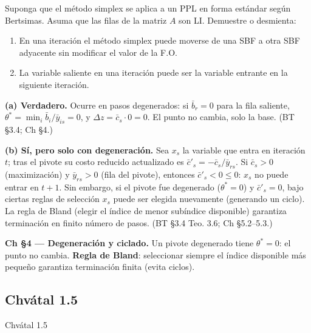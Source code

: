 \documentclass[12pt]{article}
\theoremstyle{plain}
\begin{document}
Suponga que el método simplex se aplica a un PPL en forma estándar según Bertsimas. Asuma
que las filas de la matriz $A$ son LI. Demuestre o desmienta:

\begin{enumerate}[label=\alph*)]
      \item En una iteración el método simplex puede moverse de una SBF a otra SBF
            adyacente sin modificar el valor de la F.O.

      \item La variable saliente en una iteración puede ser la variable entrante en la
            siguiente iteración.
\end{enumerate}

\begin{solucion}

\noindent\textbf{(a) Verdadero.} Ocurre en pasos degenerados: si $\bar{b}_r = 0$ para la fila saliente, $\theta^* = \min_i \bar{b}_i/\bar{y}_{is} = 0$, y $\Delta z = \bar{c}_s \cdot 0 = 0$. El punto no cambia, solo la base. (BT §3.4; Ch §4.)

\noindent\textbf{(b) Sí, pero solo con degeneración.} Sea $x_s$ la variable que entra en iteración $t$; tras el pivote su costo reducido actualizado es $\bar{c}'_s = -\bar{c}_s/\bar{y}_{rs}$. Si $\bar{c}_s > 0$ (maximización) y $\bar{y}_{rs} > 0$ (fila del pivote), entonces $\bar{c}'_s < 0 \leq 0$: $x_s$ no puede entrar en $t+1$. Sin embargo, si el pivote fue degenerado ($\theta^*=0$) y $\bar{c}'_s = 0$, bajo ciertas reglas de selección $x_s$ puede ser elegida nuevamente (generando un ciclo). La regla de Bland (elegir el índice de menor subíndice disponible) garantiza terminación en finito número de pasos. (BT §3.4 Teo. 3.6; Ch §5.2--5.3.)

\end{solucion}

\begin{teofund}
\textbf{Ch §4 — Degeneración y ciclado.} Un pivote degenerado tiene $\theta^*=0$: el punto no cambia. \textbf{Regla de Bland}: seleccionar siempre el índice disponible más pequeño garantiza terminación finita (evita ciclos).
\end{teofund}

\bigskip

\subsection{Chvátal 1.5}

Chvátal 1.5
\end{document}
